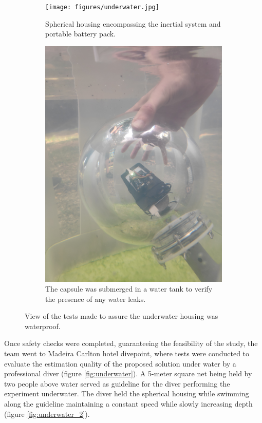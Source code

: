 \begin{figure}[!h]
    \centering
    \begin{subfigure}{0.45\textwidth}
        \centering
        \texttt{[image: figures/underwater.jpg]}
        \caption{ Spherical housing encompassing the inertial system and portable battery pack. }
        \label{fig:underwater1_test}
    \end{subfigure}
    \begin{subfigure}{0.45\textwidth}
        \centering
        \includegraphics[width=1\textwidth]{figures/underwater_1.jpg}
        \caption{ The capsule was submerged in a water tank to verify the presence of any water leaks. }
        \label{fig:underwater2_test}
    \end{subfigure}
    \label{fig:underwater_test}
    \caption{ View of the tests made to assure the underwater housing was waterproof. }
\end{figure}

Once safety checks were completed, guaranteeing the feasibility of the study, the team went to Madeira Carlton hotel divepoint, where tests were conducted to evaluate the estimation quality of the proposed solution under water by a professional diver (figure \ref{fig:underwater}). A 5-meter square net being held by two people above water served as guideline for the diver performing the experiment underwater. The diver held the spherical housing while swimming along the guideline maintaining a constant speed while slowly increasing depth (figure \ref{fig:underwater_2}).

